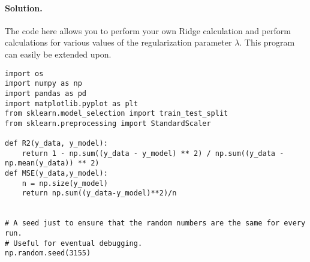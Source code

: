 \documentclass[%
oneside,                 %
final,                   %
10pt]{article}
\newenvironment{doconceexercise}{}{}
\begin{document}
\begin{doconceexercise}
\paragraph{Solution.}
The code here allows you to perform your own Ridge calculation and perform calculations for various values of the regularization parameter $\lambda$. This program can easily be extended upon.










































































\begin{verbatim}
import os
import numpy as np
import pandas as pd
import matplotlib.pyplot as plt
from sklearn.model_selection import train_test_split
from sklearn.preprocessing import StandardScaler

def R2(y_data, y_model):
    return 1 - np.sum((y_data - y_model) ** 2) / np.sum((y_data - np.mean(y_data)) ** 2)
def MSE(y_data,y_model):
    n = np.size(y_model)
    return np.sum((y_data-y_model)**2)/n


# A seed just to ensure that the random numbers are the same for every run.
# Useful for eventual debugging.
np.random.seed(3155)


\end{verbatim}
\end{doconceexercise}
\end{document}
